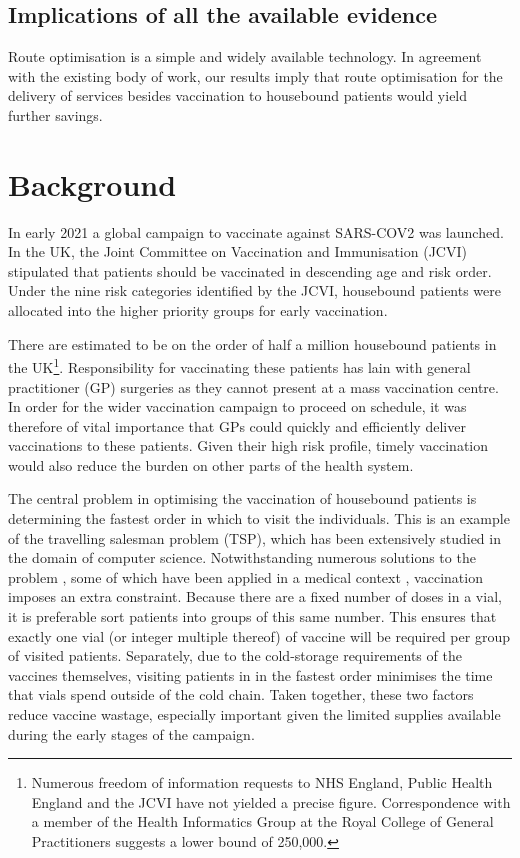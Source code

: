 \documentclass[review]{elsarticle}
\begin{document}
\subsection{Implications of all the available evidence} Route optimisation is a simple and widely available technology. In agreement with the existing body of work, our results imply that route optimisation for the delivery of services besides vaccination to housebound patients would yield further savings. 

\section{Background}
\label{sec:background}

In early 2021 a global campaign to vaccinate against SARS-COV2 was launched. In the UK, the Joint Committee on Vaccination and Immunisation (JCVI) stipulated that patients should be vaccinated in descending age and risk order. Under the nine risk categories identified by the JCVI, housebound patients were allocated into the higher priority groups for early vaccination. 

There are estimated to be on the order of half a million housebound patients in the UK\footnote{Numerous freedom of information requests to NHS England, Public Health England and the JCVI have not yielded a precise figure. Correspondence with a member of the Health Informatics Group at the Royal College of General Practitioners suggests a lower bound of 250,000.}. Responsibility for vaccinating these patients has lain with  general practitioner (GP) surgeries as they cannot present at a mass vaccination centre. In order for the wider vaccination campaign to proceed on schedule, it was therefore of vital importance that GPs could quickly and efficiently deliver vaccinations to these patients. Given their high risk profile, timely vaccination would also reduce the burden on other parts of the health system. 

The central problem in optimising the vaccination of housebound patients is determining the fastest order in which to visit the individuals. This is an example of the travelling salesman problem (TSP), which has been extensively studied in the domain of computer science. Notwithstanding numerous solutions to the problem \cite{Laporte1990}, some of which have been applied in a medical context \cite{Shao2012}, vaccination imposes an extra constraint. Because there are a fixed number of doses in a vial, it is preferable sort patients into groups of this same number. This ensures that exactly one vial (or integer multiple thereof) of vaccine will be required per group of visited patients. Separately, due to the cold-storage requirements of the vaccines themselves, visiting patients in in the fastest order minimises the time that vials spend outside of the cold chain. Taken together, these two factors reduce vaccine wastage, especially important given the limited supplies available during the early stages of the campaign. 
\end{document}
